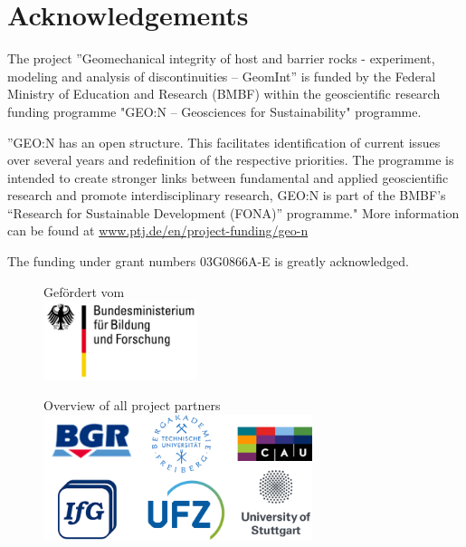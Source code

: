 %
%

\section*{Acknowledgements}
The project ''Geomechanical integrity of host and barrier rocks - experiment, modeling and analysis of discontinuities -- GeomInt'' is funded by the Federal Ministry of Education and Research (BMBF) within the geoscientific research funding programme "GEO:N – Geosciences for Sustainability" programme. 

''GEO:N has an open structure. This facilitates identification of current issues over several years and redefinition of the respective priorities. The programme is intended to create stronger links between fundamental and applied geoscientific research and promote interdisciplinary research, GEO:N is part of the BMBF's “Research for Sustainable Development (FONA)” programme."
%
More information can be found at \url{www.ptj.de/en/project-funding/geo-n}

\bigskip
The funding under grant numbers 03G0866A-E is greatly acknowledged.

\begin{figure}[ht!]
\centering
Gef\"ordert vom \\[2mm]
\includegraphics[width=0.4\textwidth]{figures/bmbf.png}
\label{fig:BMBF_1}
\end{figure}

\vspace{1cm}

\begin{figure}[ht!]
\centering
Overview of all project partners \\[4mm]
\includegraphics[width=0.7\textwidth]{figures/partner.png}
\label{fig:logos_all}
\end{figure}
